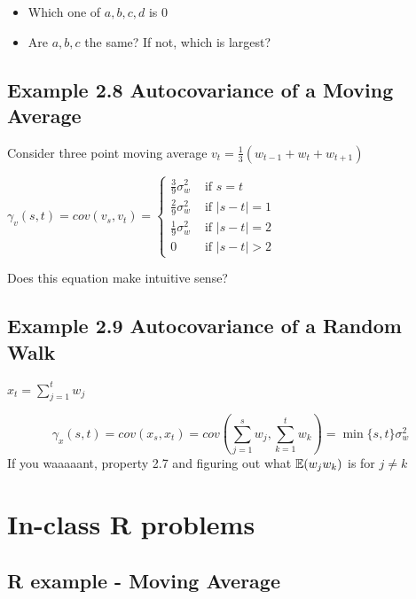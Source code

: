 \documentclass[
  letterpaper,
  DIV=11,
  numbers=noendperiod]{scrreprt}
\providecommand{\tightlist}{%
  \setlength{\itemsep}{0pt}\setlength{\parskip}{0pt}}\usepackage{longtable,booktabs,array}
\begin{document}
\begin{itemize}
\tightlist
\item
  Which one of \(a, b, c, d\) is 0
\item
  Are \(a, b, c\) the same? If not, which is largest?
\end{itemize}

\section{Example 2.8 Autocovariance of a Moving
Average}\label{example-2.8-autocovariance-of-a-moving-average-1}

Consider three point moving average
\(v_t = \frac{1}{3}(w_{t-1} + w_t + w_{t+1})\)

\(\gamma_v(s, t) = cov(v_s, v_t) =  \begin{cases}\frac{3}{9}\sigma^2_w & \text{ if } s = t\\ \frac{2}{9}\sigma^2_w & \text{ if } \vert s-t \vert = 1 \\\frac{1}{9}\sigma^2_w & \text{ if } \vert s-t \vert =2 \\0 & \text{ if } \vert s - t\vert > 2\end{cases}\)

Does this equation make intuitive sense?

\section{Example 2.9 Autocovariance of a Random
Walk}\label{example-2.9-autocovariance-of-a-random-walk}

\(x_t = \sum_{j = 1}^t w_j\)

\[
\gamma_x(s, t) = cov(x_s, x_t) = cov\left ( \sum_{j=1}^s w_j, \sum_{k = 1}^t w_k\right ) = \min\{s,t\}\sigma^2_w
\] If you waaaaant, property 2.7 and figuring out what \({\mathbb{E}}(w_jw_k)\) is
for \(j \ne k\)

\chapter{In-class R problems}\label{in-class-r-problems}

\section{R example - Moving Average}\label{r-example---moving-average-2}
\end{document}
